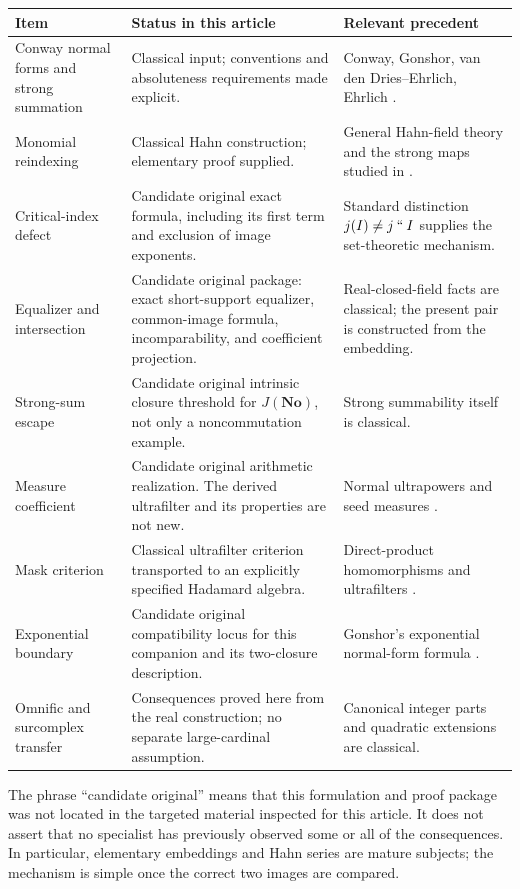 \documentclass[11pt,letterpaper]{article}
\numberwithin{equation}{section}
\theoremstyle{definition}
\theoremstyle{remark}
\newcommand{\No}{\mathbf{No}}
\newcommand{\imset}[2]{#1\mathbin{``}#2}
\begin{document}
\begin{longtable}{@{}p{}p{}p{}@{}}
\toprule
\textbf{Item} & \textbf{Status in this article} & \textbf{Relevant precedent}\\
\midrule\endhead
Conway normal forms and strong summation & Classical input; conventions and
absoluteness requirements made explicit. & Conway, Gonshor, van den
Dries--Ehrlich, Ehrlich \cite{Conway,Gonshor,vdDE,EhrlichNames}.\\[5pt]
Monomial reindexing & Classical Hahn construction; elementary proof supplied.
& General Hahn-field theory and the strong maps studied in \cite{KKS}.\\[5pt]
Critical-index defect & Candidate original exact formula, including its first
term and exclusion of image exponents. & Standard distinction
$j(I)\ne\imset jI$ supplies the set-theoretic mechanism.\\[5pt]
Equalizer and intersection & Candidate original package: exact short-support
equalizer, common-image formula, incomparability, and coefficient projection.
& Real-closed-field facts are classical; the present pair is constructed
from the embedding.\\[5pt]
Strong-sum escape & Candidate original intrinsic closure threshold for
$J(\No)$, not only a noncommutation example. & Strong summability itself is
classical.\\[5pt]
Measure coefficient & Candidate original arithmetic realization. The derived
ultrafilter and its properties are not new. & Normal ultrapowers and seed
measures \cite{Neeman}.\\[5pt]
Mask criterion & Classical ultrafilter criterion transported to an explicitly
specified Hadamard algebra. & Direct-product homomorphisms and ultrafilters
\cite{Bergman}.\\[5pt]
Exponential boundary & Candidate original compatibility locus for this
companion and its two-closure description. & Gonshor's exponential
normal-form formula \cite{Gonshor,vdDE}.\\[5pt]
Omnific and surcomplex transfer & Consequences proved here from the real
construction; no separate large-cardinal assumption. & Canonical integer
parts and quadratic extensions are classical.\\
\bottomrule
\end{longtable}

The phrase ``candidate original'' means that this formulation and proof
package was not located in the targeted material inspected for this
article. It does not assert that no specialist has previously observed
some or all of the consequences. In particular, elementary embeddings
and Hahn series are mature subjects; the mechanism is simple once the
correct two images are compared.
\end{document}
